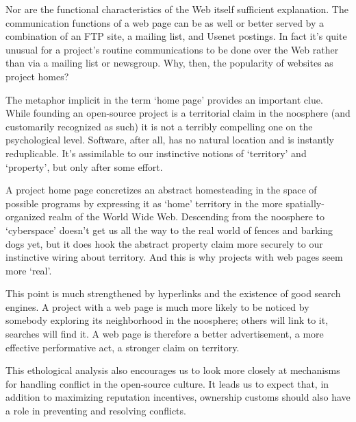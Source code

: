 Nor are the functional characteristics of the Web itself sufficient explanation.
The communication functions of a web page can be as well or better served by a
combination of an FTP site, a mailing list, and Usenet postings.  In fact it's
quite unusual for a project's routine communications to be done over the Web
rather than via a mailing list or newsgroup.  Why, then, the popularity of
websites as project homes?

The metaphor implicit in the term `home page' provides an important clue.  While
founding an open-source project is a territorial claim in the noosphere (and
customarily recognized as such) it is not a terribly compelling one on the
psychological level.  Software, after all, has no natural location and is
instantly reduplicable.  It's assimilable to our instinctive notions of
`territory' and `property', but only after some effort.

A project home page concretizes an abstract homesteading in the space of
possible programs by expressing it as `home' territory in the more
spatially-organized realm of the World Wide Web.  Descending from the noosphere
to `cyberspace' doesn't get us all the way to the real world of fences and
barking dogs yet, but it does hook the abstract property claim more securely to
our instinctive wiring about territory.  And this is why projects with web pages
seem more `real'.

This point is much strengthened by hyperlinks and the existence of good search
engines.  A project with a web page is much more likely to be noticed by
somebody exploring its neighborhood in the noosphere; others will link to it,
searches will find it.  A web page is therefore a better advertisement, a more
effective performative act, a stronger claim on territory.

This ethological analysis also encourages us to look more closely at mechanisms
for handling conflict in the open-source culture.  It leads us to expect that,
in addition to maximizing reputation incentives, ownership customs should also
have a role in preventing and resolving conflicts.
